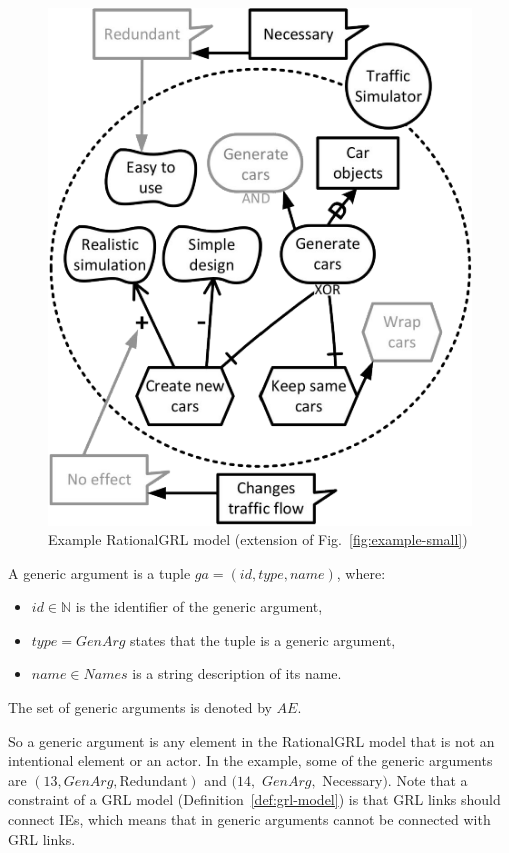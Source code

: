 \begin{figure}[b]
\centering
\includegraphics[width=\columnwidth]{img/Example1-new-attack.pdf}
\caption{Example RationalGRL model (extension of Fig.~\ref{fig:example-small})}
\label{fig:example-small3}
\end{figure} 

\begin{definition}
\label{def:generic-argument}
A generic argument is a tuple $ga=(id, type, name)$, where:
\begin{itemize}
\item $id\in \mathbb{N}$ is the identifier of the generic argument,
\item $type = GenArg$ states that the tuple is a generic argument,
\item $name\in Names$ is a string description of its name.
\end{itemize}
The set of generic arguments is denoted by $AE$.
\end{definition}

So a generic argument is any element in the RationalGRL model that is not an intentional element or an actor. In the example, some of the generic arguments are $(13, GenArg, \text{Redundant})$ and $(14,$ $GenArg,$ Necessary$)$. Note that a constraint of a GRL model (Definition~\ref{def:grl-model}) is that GRL links should connect IEs, which means that in generic arguments cannot be connected with GRL links. 
 
